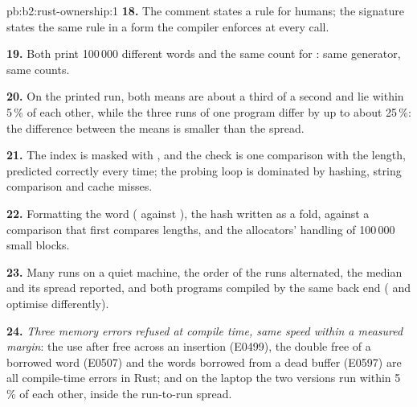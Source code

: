 \begin{solution}{pb:b2:rust-ownership:1}
\textbf{18.} The comment states a rule for humans; the signature
 states the same rule in a form the compiler enforces at every call.

\textbf{19.} Both print 100\,000 different words and the same count for : same generator, same counts.

\textbf{20.} On the printed run, both means are about a third of a second and lie within 5\,\% of each other, while
the three runs of one program differ by up to about 25\,\%: the difference between the means is smaller than the
spread.

\textbf{21.} The index is masked with , and the check is one comparison with the length, predicted
correctly every time; the probing loop is dominated by hashing, string comparison and cache misses.

\textbf{22.} Formatting the word ( against ), the hash written as a fold, 
against a  comparison that first compares lengths, and the allocators' handling of 100\,000 small blocks.

\textbf{23.} Many runs on a quiet machine, the order of the runs alternated, the median and its spread reported, and
both programs compiled by the same back end ( and  optimise differently).

\textbf{24.} \emph{Three memory errors refused at compile time, same speed within a measured margin}: the use after
free across an insertion (E0499), the double free of a borrowed word (E0507) and the words borrowed from a dead
buffer (E0597) are all compile-time errors in Rust; and on the laptop the two versions run within 5\,\% of each other,
inside the run-to-run spread.
\end{solution}
